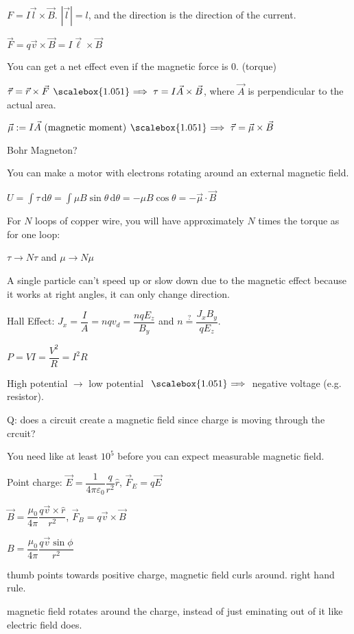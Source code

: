 \documentclass[12pt]{article}
\newcommand \dstyle \displaystyle
\newcommand \hpx [1]{\hspace{#1px}}
\newcommand \nhpx [1]{\hspace{-#1px}}
\newcommand \kvalue {\dfrac 1{4 \pi \varepsilon_0}}
\renewcommand \implies {\hpx 4 \raisebox{-0.14px}{\scalebox{1.051} =} \nhpx{5.2} \Rightarrow \hpx 3}
\renewcommand \d {\mathrm d} %
\begin{document}
$F = I \vec l \times \vec B$.
$|\vec l| = l$, and the direction is the direction of the current.

$\vec F = q \vec v \times \vec B = I \vec \ell \times \vec B$

You can get a net effect even if the magnetic force is 0. (torque)

$\vec \tau = \vec r \times \vec F \implies \tau = I \vec A \times \vec B$,
where $\vec A$ is perpendicular to the actual area.

$\vec \mu := I \vec A \text{ (magnetic moment)} \implies \vec \tau = \vec \mu \times \vec B$

Bohr Magneton?

You can make a motor with electrons rotating around an external magnetic field.

\newpage

$\dstyle U = \int \! \tau \, \d\theta
= \int \! \mu B \sin \theta \, \d\theta
= -\mu B \cos \theta
= -\vec \mu \cdot \! \vec B$

For $N$ loops of copper wire, you will have approximately $N$ times the torque as for one loop:

$\tau \to N \tau$ and $\mu \to N \mu$

A single particle can't speed up or slow down due to the magnetic effect because it works at right angles,
it can only change direction.

Hall Effect: $J_x = \dfrac I A = n q v_d = \dfrac{n q E_z}{B_y}$ and $n \stackrel?= \dfrac{J_x B_y}{q E_z}$.

$P = V I = \dfrac{V^2} R = I^2 R$


High potential $\to$ low potential $\implies$ negative voltage (e.g. resistor).

Q: does a circuit create a magnetic field since charge is moving through the crcuit?

You need like at least $10^5$ before you can expect measurable magnetic field.

Point charge:
$\vec E = \kvalue \dfrac q {r^2} \hat r$,
$\vec F_E = q \vec E$

$\vec B = \dfrac{\mu_0}{4\pi} \dfrac{q \vec v \times \hat r}{r^2}$,
$\vec F_B = q \vec v \times \vec B$

$B = \dfrac{\mu_0}{4\pi} \dfrac{q \vec v \sin \phi}{r^2}$

thumb points towards positive charge, magnetic field curls around. right hand rule.

magnetic field rotates around the charge, instead of just eminating out of it like electric field does.
\end{document}
